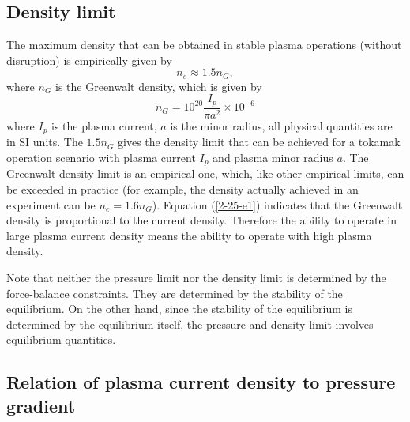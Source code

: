 \documentclass{article}
\begin{document}
\subsection{Density limit}

The maximum density that can be obtained in stable plasma operations (without
disruption) is empirically given by
\begin{equation}
  n_e \approx 1.5 n_G,
\end{equation}
where $n_G$ is the Greenwalt density, which is given by
\begin{equation}
  \label{2-25-e1} n_G = 10^{20} \frac{I_p}{\pi a^2} \times 10^{- 6}
\end{equation}
where $I_p$ is the plasma current, $a$ is the minor radius, all physical
quantities are in SI units. The $1.5 n_G$ gives the density limit that can be
achieved for a tokamak operation scenario with plasma current $I_p$ and plasma
minor radius $a$. The Greenwalt density limit is an empirical one, which, like
other empirical limits, can be exceeded in practice (for example, the density
actually achieved in an experiment can be $n_e = 1.6 n_G$). Equation
(\ref{2-25-e1}) indicates that the Greenwalt density is proportional to the
current density. Therefore the ability to operate in large plasma current
density means the ability to operate with high plasma density.

Note that neither the pressure limit nor the density limit is determined by
the force-balance constraints. They are determined by the stability of the
equilibrium. On the other hand, since the stability of the equilibrium is
determined by the equilibrium itself, the pressure and density limit involves
equilibrium quantities.

\subsection{Relation of plasma current density to pressure
gradient}\label{20-4-23-a1}
\end{document}
